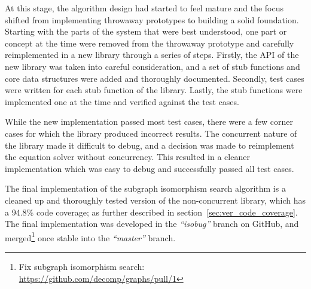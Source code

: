 At this stage, the algorithm design had started to feel mature and the focus shifted from implementing throwaway prototypes to building a solid foundation. Starting with the parts of the system that were best understood, one part or concept at the time were removed from the throwaway prototype and carefully reimplemented in a new library through a series of steps. Firstly, the API of the new library was taken into careful consideration, and a set of stub functions and core data structures were added and thoroughly documented. Secondly, test cases were written for each stub function of the library. Lastly, the stub functions were implemented one at the time and verified against the test cases.

While the new implementation passed most test cases, there were a few corner cases for which the library produced incorrect results. The concurrent nature of the library made it difficult to debug, and a decision was made to reimplement the equation solver without concurrency. This resulted in a cleaner implementation which was easy to debug and successfully passed all test cases.

The final implementation of the subgraph isomorphism search algorithm is a cleaned up and thoroughly tested version of the non-concurrent library, which has a 94.8\% code coverage; as further described in section~\ref{sec:ver_code_coverage}. The final implementation was developed in the \textit{``isobug''} branch on GitHub, and merged\footnote{Fix subgraph isomorphism search: \url{https://github.com/decomp/graphs/pull/1}} once stable into the \textit{``master''} branch.
